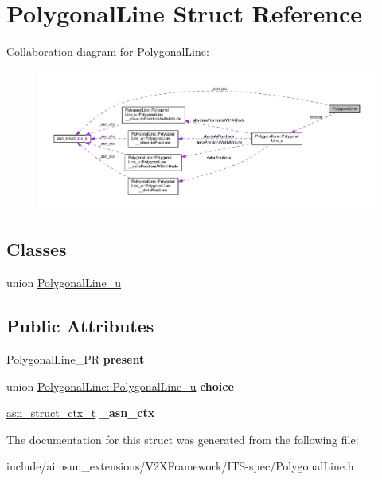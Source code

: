 \hypertarget{structPolygonalLine}{}\section{Polygonal\+Line Struct Reference}
\label{structPolygonalLine}


Collaboration diagram for Polygonal\+Line\+:\nopagebreak
\begin{figure}[H]
\begin{center}
\leavevmode
\includegraphics[width=350pt]{structPolygonalLine__coll__graph}
\end{center}
\end{figure}
\subsection*{Classes}
\begin{DoxyCompactItemize}
\item 
union \hyperlink{unionPolygonalLine_1_1PolygonalLine__u}{Polygonal\+Line\+\_\+u}
\end{DoxyCompactItemize}
\subsection*{Public Attributes}
\begin{DoxyCompactItemize}
\item 
Polygonal\+Line\+\_\+\+PR {\bfseries present}\hypertarget{structPolygonalLine_a40c639bfbfdb8814cfa640acf1ac1347}{}\label{structPolygonalLine_a40c639bfbfdb8814cfa640acf1ac1347}

\item 
union \hyperlink{unionPolygonalLine_1_1PolygonalLine__u}{Polygonal\+Line\+::\+Polygonal\+Line\+\_\+u} {\bfseries choice}\hypertarget{structPolygonalLine_ae475ad427f47d6d6cb8593b0bb853523}{}\label{structPolygonalLine_ae475ad427f47d6d6cb8593b0bb853523}

\item 
\hyperlink{structasn__struct__ctx__s}{asn\+\_\+struct\+\_\+ctx\+\_\+t} {\bfseries \+\_\+asn\+\_\+ctx}\hypertarget{structPolygonalLine_a1e1d577b5d3118c85d816b8a52893fb7}{}\label{structPolygonalLine_a1e1d577b5d3118c85d816b8a52893fb7}

\end{DoxyCompactItemize}


The documentation for this struct was generated from the following file\+:\begin{DoxyCompactItemize}
\item 
include/aimsun\+\_\+extensions/\+V2\+X\+Framework/\+I\+T\+S-\/spec/Polygonal\+Line.\+h\end{DoxyCompactItemize}

